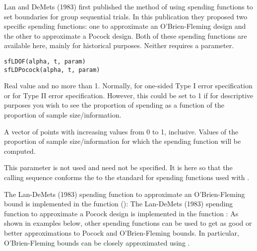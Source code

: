 \begin{Description}\relax
Lan and DeMets (1983) first published the method of using spending functions to set boundaries for group sequential trials.
In this publication they proposed two specific spending functions:
one to approximate an O'Brien-Fleming design and the other to approximate a Pocock design.
Both of these spending functions are available here, mainly for historical purposes.
Neither requires a parameter.
\end{Description}
\begin{Usage}
\begin{verbatim}
sfLDOF(alpha, t, param)
sfLDPocock(alpha, t, param)
\end{verbatim}
\end{Usage}
\begin{Arguments}
\begin{ldescription}
\item[\code{alpha}] Real value  and no more than 1. Normally, 
 for one-sided Type I error specification
or  for Type II error specification. However, this could be set to 1 if for descriptive purposes
you wish to see the proportion of spending as a function of the proportion of sample size/information.
\item[\code{t}] A vector of points with increasing values from 0 to 1, inclusive. Values of the proportion of 
sample size/information for which the spending function will be computed.
\item[\code{param}] This parameter is not used and need not be specified. It is here so that the calling sequence conforms 
the to the standard for spending functions used with .
\end{ldescription}
\end{Arguments}
\begin{Details}\relax
The Lan-DeMets (1983) spending function to approximate an
O'Brien-Fleming bound is implemented in the function ():
The Lan-DeMets (1983) spending function to approximate a Pocock design is implemented in the function :
As shown in examples below, other spending functions can be used to get as good or better approximations to Pocock and
O'Brien-Fleming bounds. In particular, O'Brien-Fleming bounds can be closely approximated using .
\end{Details}
